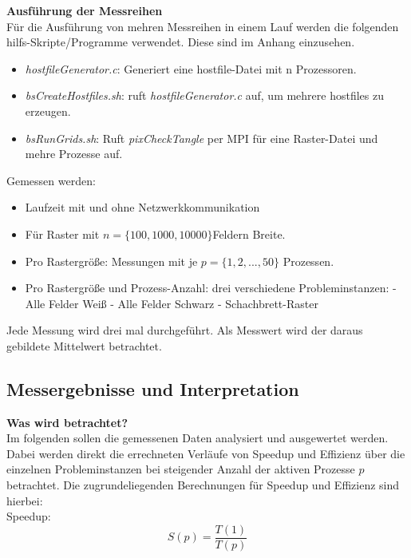 \documentclass[
10pt, %
a4paper, %
oneside, %
headinclude,footinclude, %
BCOR5mm, %
]{scrartcl}
\begin{document}
\textbf{Ausführung der Messreihen}\\ 
Für die Ausführung von mehren Messreihen in einem Lauf werden die folgenden hilfs-Skripte/Programme verwendet. Diese sind im Anhang einzusehen.
\begin{itemize}[noitemsep] %
	\item \textit{hostfileGenerator.c}: Generiert eine hostfile-Datei mit n Prozessoren.
	\item \textit{bsCreateHostfiles.sh}: ruft \textit{hostfileGenerator.c} auf, um mehrere  hostfiles zu erzeugen.
	\item \textit{bsRunGrids.sh}: Ruft \textit{pixCheckTangle} per MPI für eine Raster-Datei und mehre Prozesse auf.
\end{itemize}

Gemessen werden:
\begin{itemize}[noitemsep] %
	\item Laufzeit mit und ohne Netzwerkkommunikation
	\item Für Raster mit \(n=\{100,1000,10000\}\)Feldern Breite.
	\item Pro Rastergröße: Messungen mit je \(p=\{1,2,...,50\}\) Prozessen.
	\item Pro Rastergröße und Prozess-Anzahl: drei verschiedene Probleminstanzen: 
	\subitem - Alle Felder Weiß
	\subitem - Alle Felder Schwarz
	\subitem - Schachbrett-Raster
\end{itemize}

Jede Messung wird drei mal durchgeführt. Als Messwert wird der daraus gebildete Mittelwert betrachtet.

\subsection{Messergebnisse und Interpretation}

\textbf{Was wird betrachtet?}\\
Im folgenden sollen die gemessenen Daten analysiert und ausgewertet werden. Dabei werden direkt die errechneten Verläufe von Speedup und Effizienz über die einzelnen Probleminstanzen bei steigender Anzahl der aktiven Prozesse \(p\) betrachtet. Die zugrundeliegenden Berechnungen für Speedup und Effizienz sind hierbei:\\

Speedup:
\begin{equation}
S(p)=\frac{T(1)}{T(p)}
\end{equation}
\end{document}
